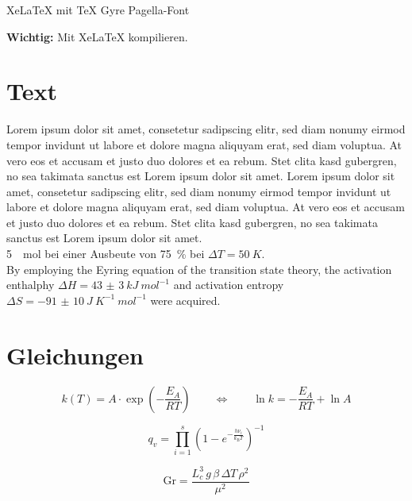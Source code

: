 \documentclass[12pt,a4paper]{article}
\begin{document}
\begin{center}\Large
XeLaTeX mit TeX Gyre Pagella-Font
\end{center}

\begin{center}
\textbf{Wichtig:} Mit XeLaTeX kompilieren.
\end{center}

\section{Text}\sloppy
Lorem ipsum dolor sit amet, consetetur sadipscing elitr, sed diam nonumy eirmod tempor invidunt ut labore et dolore magna aliquyam erat, sed diam voluptua. At vero eos et accusam et justo duo dolores et ea rebum. Stet clita kasd gubergren, no sea takimata sanctus est Lorem ipsum dolor sit amet. Lorem ipsum dolor sit amet, consetetur sadipscing elitr, sed diam nonumy eirmod tempor invidunt ut labore et dolore magna aliquyam erat, sed diam voluptua. At vero eos et accusam et justo duo dolores et ea rebum. Stet clita kasd gubergren, no sea takimata sanctus est Lorem ipsum dolor sit amet.\\

\SI{5}{\mu mol} bei einer Ausbeute von \SI{75}{\%} bei $\Delta T=\SI{50}{K}$. \\

By employing the Eyring equation of the transition state theory, the activation enthalphy $\Delta H=\SI{43(3)}{kJ\:mol^{-1}}$ and activation entropy $\Delta S=\SI{-91(10)}{J\:K^{-1}\:mol^{-1}}$ were acquired.


\section{Gleichungen}
\begin{equation}
k(T)=A\cdot\exp\left(-\frac{E_A}{RT}\right)\qquad\Leftrightarrow\qquad \ln k=-\frac{E_A}{RT}+\ln A
\end{equation}

\begin{equation}
q_v=\prod_{i=1}^s\left(1-e^{-\frac{h\nu_i}{k_\textrm{B}T}}\right)^{-1}
\end{equation}

\begin{equation}
\textrm{Gr}=\frac{L_c^3\,g\,\beta\,\Delta T\,\rho^2}{\mu^2}
\end{equation}
\end{document}
